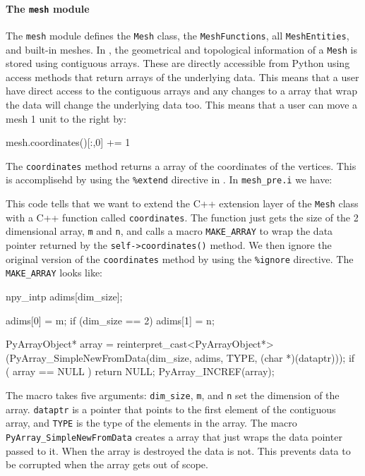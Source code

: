 \paragraph{The \texttt{mesh} module}
The \texttt{mesh} module defines the \texttt{Mesh} class, the \texttt{MeshFunctions}, all \texttt{MeshEntities}, and built-in meshes. In \dolfin,  the geometrical and topological information of a \texttt{Mesh} is stored using contiguous arrays. These are directly accessible from Python using access methods that return \numpy arrays of the underlying data. This means that a user have direct access to the contiguous arrays and any changes to a \numpy array that wrap the data will change the underlying data too. This means that a user can move a mesh 1 unit to the right by:
\begin{python}
mesh.coordinates()[:,0] += 1
\end{python}
The \texttt{coordinates} method returns a \numpy array of the coordinates of the vertices. This is accomplisehd by using the \texttt{\%extend} directive in \swig. In \texttt{mesh\_pre.i} we have:
This code tells \swig that we want to extend the C++ extension layer of the \texttt{Mesh} class with a C++ function called \texttt{coordinates}. The function just gets the size of the 2 dimensional array, \texttt{m} and \texttt{n}, and calls a macro \texttt{MAKE\_}\texttt{ARRAY} to wrap the data pointer returned by the \texttt{self->}\texttt{coordinates()} method. We then ignore the original version of the \texttt{coordinates} method by using the \texttt{\%ignore} directive. The \texttt{MAKE\_}\texttt{ARRAY} looks like:
\begin{c++}
  npy_intp adims[dim_size];

  adims[0] = m;
  if (dim_size == 2)
    adims[1] = n;

  PyArrayObject* array = reinterpret_cast<PyArrayObject*>(PyArray_SimpleNewFromData(dim_size, adims, TYPE, (char *)(dataptr)));
  if ( array == NULL ) return NULL;
  PyArray_INCREF(array);
\end{c++}
The macro takes five arguments: \texttt{dim\_size}, \texttt{m}, and \texttt{n} set the dimension of the \numpy array. \texttt{dataptr} is a pointer that points to the first element of the contiguous array, and \texttt{TYPE} is the type of the elements in the array. The \numpy macro \texttt{PyArray\_}\texttt{SimpleNewFromData} creates a \numpy array that just wraps the data pointer passed to it. When the \numpy array is destroyed the data is not. This prevents data to be corrupted when the \numpy array gets out of scope. \par

